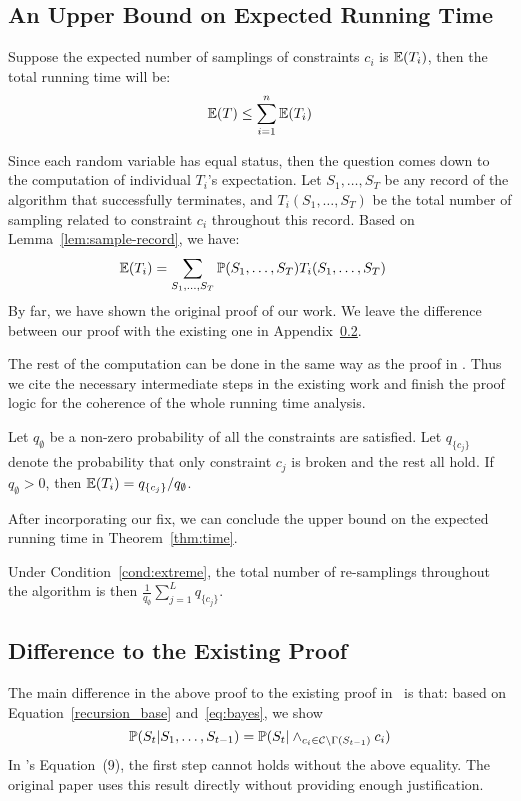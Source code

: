 \subsection{An Upper Bound on Expected Running Time}
Suppose the expected number of samplings of constraints $c_i$ is $\mathbb{E}(T_i)$, then the total running time will be:
\begin{equation*}
\mathbb{E}(T) \le \sum_{i=1}^n \mathbb{E} (T_i)
\end{equation*}

Since each random variable has equal status, then the question comes down to the computation of individual $T_i$'s expectation. Let $S_1,\ldots,S_T$ be any record of the algorithm that successfully terminates, and $T_i(S_1,\ldots,S_T)$ be the total number of sampling related to constraint $c_i$ throughout this record.  Based on Lemma~\ref{lem:sample-record}, we have:
\begin{align*} \label{ti_formula}
    \mathbb{E}(T_i) &= \sum_{S_1,\ldots,S_T} \mathbb{P}(S_1,\ldots,S_T)T_i(S_1,\ldots,S_T) 
\end{align*}
{By far, we have shown the original proof of our work. We leave the difference between our proof with the existing one in Appendix~\ref{apx:difference}.}

The rest of the computation can be done in the same way as the proof in \citet{DBLP:journals/jacm/GuoJL19}. Thus we cite the necessary intermediate steps in the existing work and finish the proof logic for the coherence of the whole running time analysis.
\begin{lemma*} \label{thm:runtime} Let $q_{\emptyset}$ be a non-zero probability of all the constraints are satisfied. Let $q_{\{c_j\}}$ denote the probability that only constraint $c_j$ is broken and the rest all hold. If $q_\emptyset>0$, then
$\mathbb{E}(T_i) ={q_{\{c_j\}}}/{q_\emptyset}$.
\end{lemma*}

After incorporating our fix, we can conclude the upper bound on the expected running time in Theorem~\ref{thm:time}.
\begin{theorem} \label{thm:time} Under Condition~\ref{cond:extreme},
 the total number of re-samplings throughout the algorithm is then $\frac{1}{q_{\emptyset}}\sum_{j=1}^L q_{\{c_j\}}$.
\end{theorem}

\subsection{Difference to the Existing Proof}  \label{apx:difference}
 The main difference in the above proof to the existing proof in~\cite[Theorem 13]{DBLP:journals/jacm/GuoJL19} is that: based on Equation~\eqref{recursion_base} and~\eqref{eq:bayes}, we show
\begin{equation*}
\mathbb{P}(S_t | S_1, \ldots, S_{t-1})=\mathbb{P}(S_t |\wedge_{c_i \in \mathcal{C}\backslash \Gamma(S_{t-1})}c_i)
\end{equation*}
In \citet{DBLP:journals/jacm/GuoJL19}'s Equation~(9), the first step cannot holds without the above equality. The original paper uses this result directly without providing enough justification.

